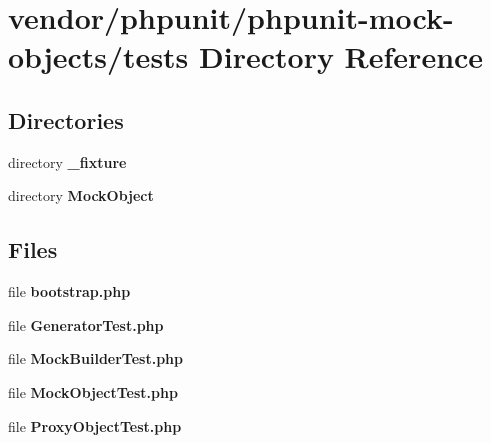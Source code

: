 \section{vendor/phpunit/phpunit-\/mock-\/objects/tests Directory Reference}
\label{dir_48c8bf167c528ebddd35d0c18a54ece4}
\subsection*{Directories}
\begin{DoxyCompactItemize}
\item 
directory {\bf \+\_\+fixture}
\item 
directory {\bf Mock\+Object}
\end{DoxyCompactItemize}
\subsection*{Files}
\begin{DoxyCompactItemize}
\item 
file {\bf bootstrap.\+php}
\item 
file {\bf Generator\+Test.\+php}
\item 
file {\bf Mock\+Builder\+Test.\+php}
\item 
file {\bf Mock\+Object\+Test.\+php}
\item 
file {\bf Proxy\+Object\+Test.\+php}
\end{DoxyCompactItemize}

